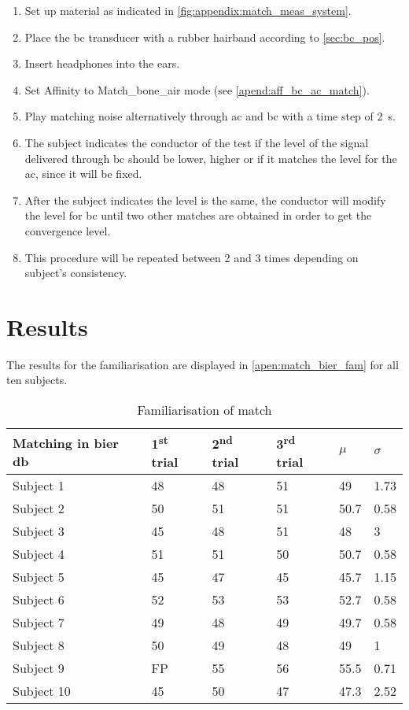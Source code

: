 \begin{enumerate}
\item Set up material as indicated in \autoref{fig:appendix:match_meas_system}.
\item Place the \gls{bc} transducer with a rubber hairband according to \autoref{sec:bc_pos}.
\item Insert headphones into the ears.
\item Set Affinity to Match_bone_air mode (see \autoref{apend:aff_bc_ac_match}).
\item Play matching noise alternatively through \gls{ac} and \gls{bc} with a time step of \SI{2}{\second}.
\item The  subject indicates the conductor of the test if the level of the signal delivered through \gls{bc} should be lower, higher or if it matches the level for the \gls{ac}, since it will be fixed.
\item After the subject indicates the level is the same, the conductor will modify the level for \gls{bc} until two other matches are obtained in order to get the convergence level.
\item This procedure will be repeated between 2 and 3 times depending on subject's consistency.
\end{enumerate}

\section*{Results}

The results for the familiarisation are displayed in \autoref{apen:match_bier_fam} for all ten subjects. 

\begin{table}[H]
\centering
\caption{Familiarisation of match}
\begin{tabular}{l|lll|ll}
Matching in bier \si{\decibel}  &1\textsuperscript{st} trial & 2\textsuperscript{nd} trial & 3\textsuperscript{rd} trial & $\mu$   & $\sigma$ \\ \hline
Subject 1           & 48    & 48    & 51    & 49   & 1.73  \\
Subject 2           & 50    & 51    & 51    & 50.7 & 0.58  \\
Subject 3           & 45    & 48    & 51    & 48   & 3     \\
Subject 4           & 51    & 51    & 50    & 50.7 & 0.58  \\
Subject 5           & 45    & 47    & 45    & 45.7 & 1.15  \\
Subject 6           & 52    & 53    & 53    & 52.7 & 0.58  \\
Subject 7           & 49    & 48    & 49    & 49.7 & 0.58  \\
Subject 8           & 50    & 49    & 48    & 49   & 1     \\
Subject 9           & FP    & 55    & 56    & 55.5   & 0.71  \\
Subject 10          & 45    & 50    & 47    & 47.3 & 2.52 
\end{tabular}
\label{apen:match_bier_fam} 
\end{table}

